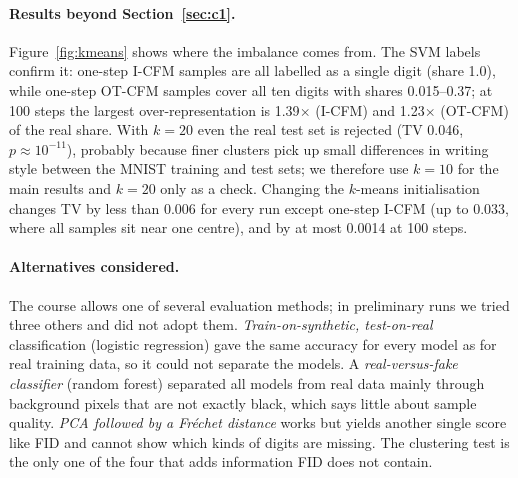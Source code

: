 \paragraph{Results beyond Section~\ref{sec:c1}.} Figure~\ref{fig:kmeans} shows where the imbalance comes from. The SVM labels confirm it: one-step I-CFM samples are all labelled as a single digit (share 1.0), while one-step OT-CFM samples cover all ten digits with shares 0.015--0.37; at 100 steps the largest over-representation is 1.39$\times$ (I-CFM) and 1.23$\times$ (OT-CFM) of the real share. With $k=20$ even the real test set is rejected (TV 0.046, $p\approx10^{-11}$), probably because finer clusters pick up small differences in writing style between the MNIST training and test sets; we therefore use $k=10$ for the main results and $k=20$ only as a check. Changing the $k$-means initialisation changes TV by less than 0.006 for every run except one-step I-CFM (up to 0.033, where all samples sit near one centre), and by at most 0.0014 at 100 steps.

\paragraph{Alternatives considered.} The course allows one of several evaluation methods; in preliminary runs we tried three others and did not adopt them. %
\emph{Train-on-synthetic, test-on-real} classification (logistic regression) gave the same accuracy for every model as for real training data, so it could not separate the models.
A \emph{real-versus-fake classifier} (random forest) separated all models from real data mainly through background pixels that are not exactly black, which says little about sample quality.
\emph{PCA followed by a Fr\'echet distance} works but yields another single score like FID and cannot show which kinds of digits are missing. The clustering test is the only one of the four that adds information FID does not contain.

